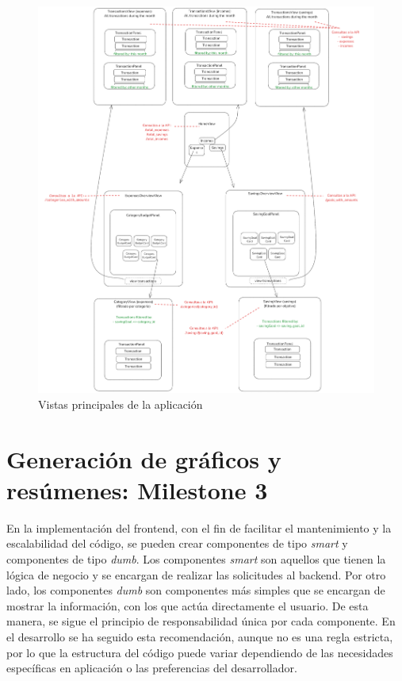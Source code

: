 \begin{figure}[ht!]
    \centering
    \includegraphics[width=\linewidth]{imagenes/componentes-frontend.png}
    \caption{Vistas principales de la aplicación}
    \label{fig:componentes_frontend}
\end{figure}



\section{Generación de gráficos y resúmenes: Milestone 3}\label{cap:milestone3}
En la implementación del frontend, con el fin de facilitar el mantenimiento y la escalabilidad del código, se pueden crear componentes de tipo \textit{smart} y componentes de tipo \textit{dumb}. Los componentes \textit{smart} son aquellos que tienen la lógica de negocio y se encargan de realizar las solicitudes al backend. Por otro lado, los componentes \textit{dumb} son componentes más simples que se encargan de mostrar la información, con los que actúa directamente el usuario. De esta manera, se sigue el principio de responsabilidad única por cada componente. En el desarrollo se ha seguido esta recomendación, aunque no es una regla estricta, por lo que la estructura del código puede variar dependiendo de las necesidades específicas en aplicación o las preferencias del desarrollador.

